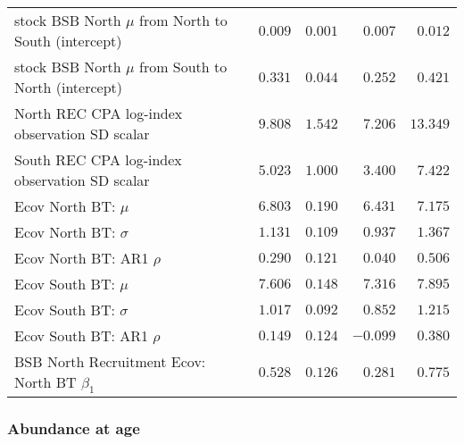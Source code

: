 \documentclass[
]{article}
\begin{document}
\begin{landscape}
\begin{longtable}[t]{lrrrr}
stock BSB North $\mu$ from North to South (intercept) & $0.009$ & $0.001$ & $0.007$ & $0.012$\\
stock BSB North $\mu$ from South to North (intercept) & $0.331$ & $0.044$ & $0.252$ & $0.421$\\
North REC CPA log-index observation SD scalar & $9.808$ & $1.542$ & $7.206$ & $13.349$\\
\addlinespace
South REC CPA log-index observation SD scalar & $5.023$ & $1.000$ & $3.400$ & $7.422$\\
Ecov North BT: $\mu$ & $6.803$ & $0.190$ & $6.431$ & $7.175$\\
Ecov North BT: $\sigma$ & $1.131$ & $0.109$ & $0.937$ & $1.367$\\
Ecov North BT: AR1 $\rho$ & $0.290$ & $0.121$ & $0.040$ & $0.506$\\
Ecov South BT: $\mu$ & $7.606$ & $0.148$ & $7.316$ & $7.895$\\
\addlinespace
Ecov South BT: $\sigma$ & $1.017$ & $0.092$ & $0.852$ & $1.215$\\
Ecov South BT: AR1 $\rho$ & $0.149$ & $0.124$ & $-0.099$ & $0.380$\\
BSB North Recruitment Ecov: North BT $\beta_1$ & $0.528$ & $0.126$ & $0.281$ & $0.775$\\*
\end{longtable}
\end{landscape}

\hypertarget{abundance-at-age}{%
\subsubsection{Abundance at age}\label{abundance-at-age}}
\end{document}
